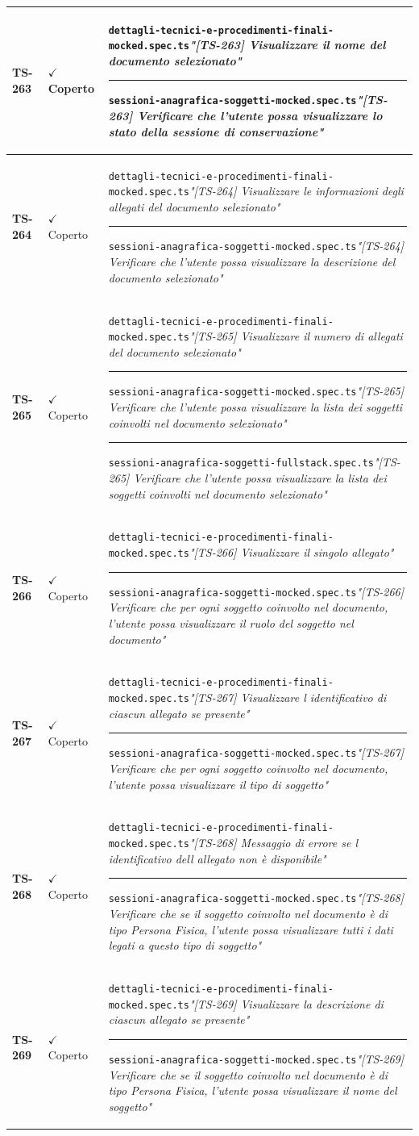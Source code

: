 \documentclass[a4paper,12pt]{article}
\newcommand{\ok}{\textcolor{green!60!black}{$\checkmark$ Coperto}}
\newcommand{\f}[1]{\nolinkurl{#1}\newline}
\newcommand{\q}[1]{\textit{#1}}
\newcommand{\sep}{\newline \vspace{2mm} \hrule \vspace{2mm}}
\begin{document}
\begin{longtable}{|p{1.5cm}|p{3.0cm}|p{10.5cm}|}
\textbf{TS-263} & \ok & \f{dettagli-tecnici-e-procedimenti-finali-mocked.spec.ts}\q{"[TS-263] Visualizzare il nome del documento selezionato"} \sep \f{sessioni-anagrafica-soggetti-mocked.spec.ts}\q{"[TS-263] Verificare che l'utente possa visualizzare lo stato della sessione di conservazione"} \\ \hline
\textbf{TS-264} & \ok & \f{dettagli-tecnici-e-procedimenti-finali-mocked.spec.ts}\q{"[TS-264] Visualizzare le informazioni degli allegati del documento selezionato"} \sep \f{sessioni-anagrafica-soggetti-mocked.spec.ts}\q{"[TS-264] Verificare che l'utente possa visualizzare la descrizione del documento selezionato"} \\ \hline
\textbf{TS-265} & \ok & \f{dettagli-tecnici-e-procedimenti-finali-mocked.spec.ts}\q{"[TS-265] Visualizzare il numero di allegati del documento selezionato"} \sep \f{sessioni-anagrafica-soggetti-mocked.spec.ts}\q{"[TS-265] Verificare che l'utente possa visualizzare la lista dei soggetti coinvolti nel documento selezionato"} \sep \f{sessioni-anagrafica-soggetti-fullstack.spec.ts}\q{"[TS-265] Verificare che l'utente possa visualizzare la lista dei soggetti coinvolti nel documento selezionato"} \\ \hline
\textbf{TS-266} & \ok & \f{dettagli-tecnici-e-procedimenti-finali-mocked.spec.ts}\q{"[TS-266] Visualizzare il singolo allegato"} \sep \f{sessioni-anagrafica-soggetti-mocked.spec.ts}\q{"[TS-266] Verificare che per ogni soggetto coinvolto nel documento, l'utente possa visualizzare il ruolo del soggetto nel documento"} \\ \hline
\textbf{TS-267} & \ok & \f{dettagli-tecnici-e-procedimenti-finali-mocked.spec.ts}\q{"[TS-267] Visualizzare l identificativo di ciascun allegato se presente"} \sep \f{sessioni-anagrafica-soggetti-mocked.spec.ts}\q{"[TS-267] Verificare che per ogni soggetto coinvolto nel documento, l'utente possa visualizzare il tipo di soggetto"} \\ \hline
\textbf{TS-268} & \ok & \f{dettagli-tecnici-e-procedimenti-finali-mocked.spec.ts}\q{"[TS-268] Messaggio di errore se l identificativo dell allegato non è disponibile"} \sep \f{sessioni-anagrafica-soggetti-mocked.spec.ts}\q{"[TS-268] Verificare che se il soggetto coinvolto nel documento è di tipo Persona Fisica, l'utente possa visualizzare tutti i dati legati a questo tipo di soggetto"} \\ \hline
\textbf{TS-269} & \ok & \f{dettagli-tecnici-e-procedimenti-finali-mocked.spec.ts}\q{"[TS-269] Visualizzare la descrizione di ciascun allegato se presente"} \sep \f{sessioni-anagrafica-soggetti-mocked.spec.ts}\q{"[TS-269] Verificare che se il soggetto coinvolto nel documento è di tipo Persona Fisica, l'utente possa visualizzare il nome del soggetto"} \\ \hline

\end{longtable}
\end{document}
